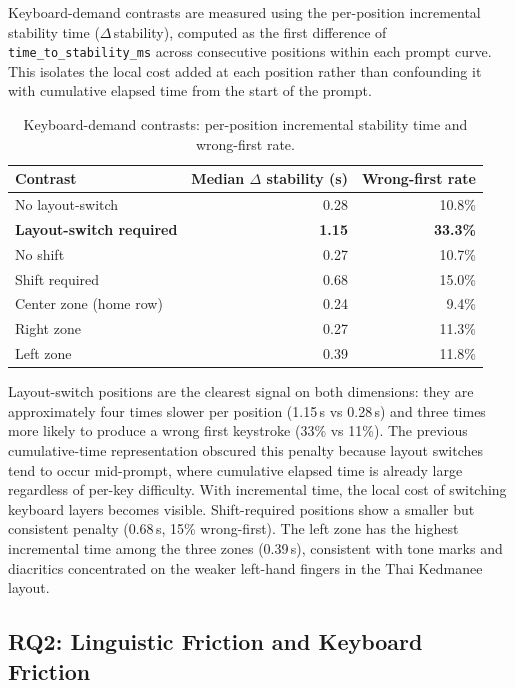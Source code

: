 \documentclass[11pt,a4paper]{article}
\newcommand{\metric}[1]{\texttt{#1}}
\begin{document}
Keyboard-demand contrasts are measured using the per-position incremental stability time ($\Delta$\,stability), computed as the first difference of \metric{time\_to\_stability\_ms} across consecutive positions within each prompt curve. This isolates the local cost added at each position rather than confounding it with cumulative elapsed time from the start of the prompt.

\begin{table}[H]
\centering
\caption{Keyboard-demand contrasts: per-position incremental stability time and wrong-first rate.}
\label{tab:keyboard_demand}
\small
\begin{tabular}{l r r}
\toprule
Contrast & Median $\Delta$ stability (s) & Wrong-first rate \\
\midrule
No layout-switch       & 0.28 & 10.8\% \\
\textbf{Layout-switch required} & \textbf{1.15} & \textbf{33.3\%} \\
No shift               & 0.27 & 10.7\% \\
Shift required         & 0.68 & 15.0\% \\
Center zone (home row) & 0.24 &  9.4\% \\
Right zone             & 0.27 & 11.3\% \\
Left zone              & 0.39 & 11.8\% \\
\bottomrule
\end{tabular}
\end{table}

Layout-switch positions are the clearest signal on both dimensions: they are approximately four times slower per position (1.15\,s vs 0.28\,s) and three times more likely to produce a wrong first keystroke (33\% vs 11\%). The previous cumulative-time representation obscured this penalty because layout switches tend to occur mid-prompt, where cumulative elapsed time is already large regardless of per-key difficulty. With incremental time, the local cost of switching keyboard layers becomes visible. Shift-required positions show a smaller but consistent penalty (0.68\,s, 15\% wrong-first). The left zone has the highest incremental time among the three zones (0.39\,s), consistent with tone marks and diacritics concentrated on the weaker left-hand fingers in the Thai Kedmanee layout.

\subsection{RQ2: Linguistic Friction and Keyboard Friction}
\end{document}
